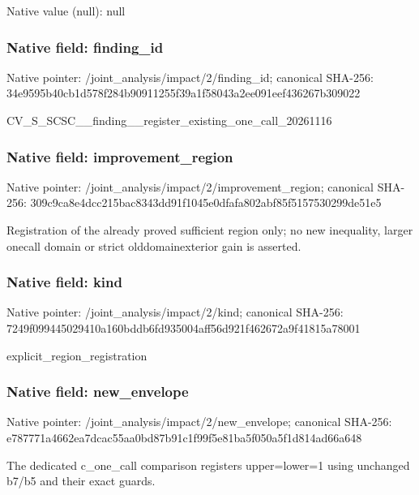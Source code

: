 \documentclass[10pt,a4paper]{article}
\begin{document}
Native value (null): null



\subsubsection{Native field: finding\_id}


Native pointer: /joint\_analysis/impact/2/finding\_id; canonical SHA-256: 34e9595b40cb1d578f284b90\allowbreak{}911255f39a1f58043a2ee091\allowbreak{}eef436267b309022


CV\_S\_SCSC\_\_finding\_\_regi\allowbreak{}ster\_existing\_one\_call\_2\allowbreak{}0261116


\subsubsection{Native field: improvement\_region}


Native pointer: /joint\_analysis/impact/2\allowbreak{}/improvement\_region; canonical SHA-256: 309c9ca8e4dcc215bac8343d\allowbreak{}d91f1045e0dfafa802abf85f\allowbreak{}5157530299de51e5


Registration of the already proved sufficient region only; no new inequality, larger onecall domain or strict olddomainexterior gain is asserted.


\subsubsection{Native field: kind}


Native pointer: /joint\_analysis/impact/2/kind; canonical SHA-256: 7249f099445029410a160bdd\allowbreak{}b6fd935004aff56d921f4626\allowbreak{}72a9f41815a78001


explicit\_region\_registration


\subsubsection{Native field: new\_envelope}


Native pointer: /joint\_analysis/impact/2/new\_envelope; canonical SHA-256: e787771a4662ea7dcac55aa0\allowbreak{}bd87b91c1f99f5e81ba5f050\allowbreak{}a5f1d814ad66a648


The dedicated c\_one\_call comparison registers upper=lower=1 using unchanged b7/b5 and their exact guards.
\end{document}
